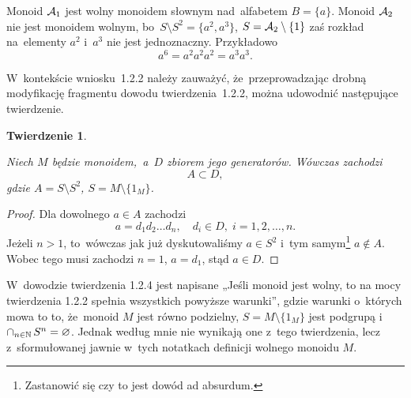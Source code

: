 \documentclass[a4paper,11pt]{article}
\newtheorem{theorem}{Twierdzenie}  %
\begin{document}
Monoid $\mathcal{A}_{ 1 }$ jest wolny monoidem słownym nad~alfabetem
$B = \{ a \}$. Monoid $\mathcal{A}_{ 2 }$ nie jest monoidem wolnym,
bo~$S \setminus S^{ 2 } = \{ a^{ 2 }, a^{ 3 } \}$,
$S = \mathcal{A}_{ 2 } \setminus \{ 1 \}$ zaś rozkład na~elementy $a^{ 2 }$
i~$a^{ 3 }$ nie jest jednoznaczny. Przykładowo
\begin{equation}
  \label{eq:Forys-Forys-36}
  a^{ 6 } = a^{ 2 } a^{ 2 } a^{ 2 } = a^{ 3 } a^{ 3 }.
\end{equation}

\vspace{\spaceFour}





 W~kontekście wniosku~1.2.2 należy zauważyć, że~przeprowadzając
drobną modyfikację fragmentu dowodu twierdzenia~1.2.2, można udowodnić
następujące twierdzenie.





\begin{theorem}
  \label{thm:Forys-Forys-02}

  Niech $M$ będzie monoidem,~a~$D$ zbiorem jego generatorów. Wówczas
  zachodzi
  \begin{equation}
    \label{eq:Forys-Forys-37}
    A \subset D,
  \end{equation}
  gdzie $A = S \setminus S^{ 2 }$, $S = M \setminus \{ 1_{ M } \}$.

\end{theorem}



\begin{proof}

  Dla dowolnego $a \in A$ zachodzi
  \begin{equation}
    \label{eq:Forys-Forys-38}
    a = d_{ 1 } d_{ 2 } \ldots d_{ n }, \quad
    d_{ i } \in D,\; i = 1, 2, \ldots, n.
  \end{equation}
  Jeżeli $n > 1$, to~wówczas jak już dyskutowaliśmy $a \in S^{ 2 }$
  i~tym samym\footnote{Zastanowić się czy to jest dowód ad absurdum.}
  $a \notin A$. Wobec tego musi zachodzi $n = 1$, $a = d_{ 1 }$, stąd
  $a \in D$.

\end{proof}





 W~dowodzie twierdzenia 1.2.4 jest napisane „Jeśli monoid jest
wolny, to na mocy twierdzenia 1.2.2 spełnia wszystkich powyższe warunki”,
gdzie warunki o~których mowa to to, że~monoid $M$ jest równo podzielny,
$S = M \setminus \{ 1_{ M } \}$ jest podgrupą i~$\cap_{ n \in \mathbb{N} } \, S^{ n } = \varnothing$. Jednak
według mnie nie wynikają one z~tego twierdzenia, lecz z~sformułowanej
jawnie w~tych notatkach definicji wolnego monoidu $M$.
\end{document}
